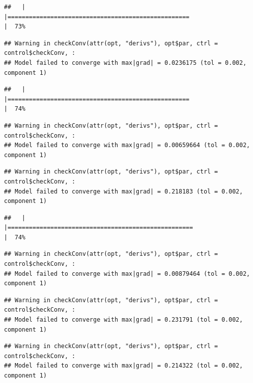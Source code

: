 \documentclass[
  12pt,
]{book}
\begin{document}
\begin{verbatim}
##   |                                                                              |===================================================                   |  73%
\end{verbatim}

\begin{verbatim}
## Warning in checkConv(attr(opt, "derivs"), opt$par, ctrl = control$checkConv, :
## Model failed to converge with max|grad| = 0.0236175 (tol = 0.002, component 1)
\end{verbatim}

\begin{verbatim}
##   |                                                                              |===================================================                   |  74%
\end{verbatim}

\begin{verbatim}
## Warning in checkConv(attr(opt, "derivs"), opt$par, ctrl = control$checkConv, :
## Model failed to converge with max|grad| = 0.00659664 (tol = 0.002, component 1)
\end{verbatim}

\begin{verbatim}
## Warning in checkConv(attr(opt, "derivs"), opt$par, ctrl = control$checkConv, :
## Model failed to converge with max|grad| = 0.218183 (tol = 0.002, component 1)
\end{verbatim}

\begin{verbatim}
##   |                                                                              |====================================================                  |  74%
\end{verbatim}

\begin{verbatim}
## Warning in checkConv(attr(opt, "derivs"), opt$par, ctrl = control$checkConv, :
## Model failed to converge with max|grad| = 0.00879464 (tol = 0.002, component 1)
\end{verbatim}

\begin{verbatim}
## Warning in checkConv(attr(opt, "derivs"), opt$par, ctrl = control$checkConv, :
## Model failed to converge with max|grad| = 0.231791 (tol = 0.002, component 1)
\end{verbatim}

\begin{verbatim}
## Warning in checkConv(attr(opt, "derivs"), opt$par, ctrl = control$checkConv, :
## Model failed to converge with max|grad| = 0.214322 (tol = 0.002, component 1)
\end{verbatim}
\end{document}
